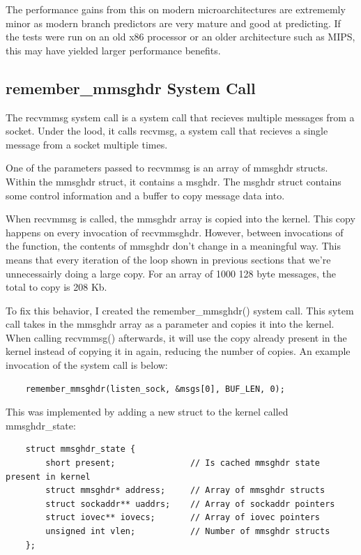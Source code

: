 \documentclass[11pt]{article}
\begin{document}
The performance gains from this on modern microarchitectures are extrememly minor as modern branch predictors are very mature 
and good at predicting. If the tests were run on an old x86 processor or an older architecture such as MIPS, this may have 
yielded larger performance benefits.


\subsection{remember\_mmsghdr System Call}

The recvmmsg system call is a system call that recieves multiple messages from a socket. Under the lood, it calls recvmsg, a system 
call that recieves a single message from a socket multiple times. 

One of the parameters passed to recvmmsg is an array of mmsghdr structs. Within the mmsghdr struct, it contains a msghdr. The msghdr 
struct contains some control information and a buffer to copy message data into. 

When recvmmsg is called, the mmsghdr array is copied into the kernel. This copy happens on every invocation of recvmmsghdr. 
However, between invocations of the function, the contents of mmsghdr don't change in a meaningful way. This means that every iteration 
of the loop shown in previous sections that we're unnecessairly doing a large copy. For an array of 1000 128 byte messages, the total 
to copy is 208 Kb. 

To fix this behavior, I created the remember\_mmsghdr() system call. This sytem call takes in the mmsghdr array as a parameter and copies 
it into the kernel. When calling recvmmsg() afterwards, it will use the copy already present in the kernel instead of copying it in 
again, reducing the number of copies. An example invocation of the system call is below:

\begin{verbatim}
    remember_mmsghdr(listen_sock, &msgs[0], BUF_LEN, 0);
\end{verbatim}

This was implemented by adding a new struct to the kernel called mmsghdr\_state:

\begin{verbatim}
    struct mmsghdr_state {
        short present;               // Is cached mmsghdr state present in kernel 
        struct mmsghdr* address;     // Array of mmsghdr structs
        struct sockaddr** uaddrs;    // Array of sockaddr pointers
        struct iovec** iovecs;       // Array of iovec pointers
        unsigned int vlen;           // Number of mmsghdr structs
    };
\end{verbatim}
\end{document}
